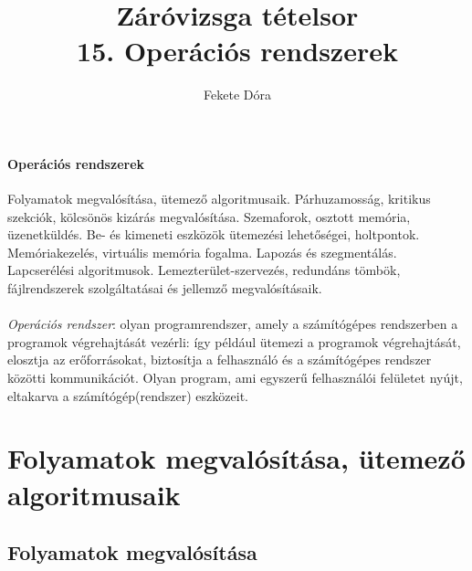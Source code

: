 \documentclass[margin=0px]{article}
\title{Záróvizsga tételsor \\ \large 15. Operációs rendszerek}
\date{}
\author{Fekete Dóra}
\newenvironment{tetel}[1]{\paragraph{#1 \\}}{}
\begin{document}
	\maketitle
	
	\begin{tetel}{Operációs rendszerek}
			Folyamatok megvalósítása, ütemező algoritmusaik. Párhuzamosság, kritikus szekciók, kölcsönös kizárás megvalósítása. Szemaforok, osztott memória, üzenetküldés. Be- és kimeneti eszközök ütemezési lehetőségei, holtpontok. Memóriakezelés, virtuális memória fogalma. Lapozás és szegmentálás. Lapcserélési algoritmusok. Lemezterület-szervezés, redundáns tömbök, fájlrendszerek szolgáltatásai és jellemző megvalósításaik.
	\end{tetel}
	\\
	\\
	\textit{Operációs rendszer}: olyan programrendszer, amely a számítógépes rendszerben a programok végrehajtását vezérli: így például ütemezi a programok végrehajtását, elosztja az erőforrásokat, biztosítja a felhasználó és a számítógépes rendszer közötti kommunikációt. Olyan program, ami egyszerű felhasználói felületet nyújt, eltakarva a számítógép(rendszer) eszközeit. \\
	
	\section{Folyamatok megvalósítása, ütemező algoritmusaik}
	
	\subsection{Folyamatok megvalósítása}
	
\end{document}
